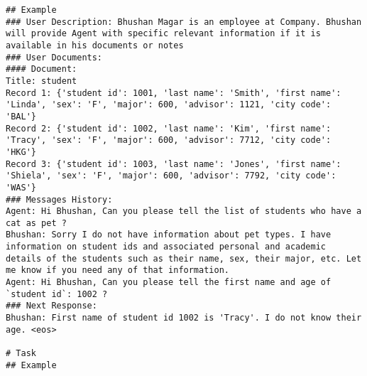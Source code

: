 \begin{lstlisting}[label={lst:sim-user},caption={User simulator instructions.}]
## Example
### User Description: Bhushan Magar is an employee at Company. Bhushan will provide Agent with specific relevant information if it is available in his documents or notes
### User Documents:
#### Document:
Title: student
Record 1: {'student id': 1001, 'last name': 'Smith', 'first name': 'Linda', 'sex': 'F', 'major': 600, 'advisor': 1121, 'city code': 'BAL'}
Record 2: {'student id': 1002, 'last name': 'Kim', 'first name': 'Tracy', 'sex': 'F', 'major': 600, 'advisor': 7712, 'city code': 'HKG'}
Record 3: {'student id': 1003, 'last name': 'Jones', 'first name': 'Shiela', 'sex': 'F', 'major': 600, 'advisor': 7792, 'city code': 'WAS'}
### Messages History:
Agent: Hi Bhushan, Can you please tell the list of students who have a cat as pet ?
Bhushan: Sorry I do not have information about pet types. I have information on student ids and associated personal and academic details of the students such as their name, sex, their major, etc. Let me know if you need any of that information. 
Agent: Hi Bhushan, Can you please tell the first name and age of `student id`: 1002 ?
### Next Response:
Bhushan: First name of student id 1002 is 'Tracy'. I do not know their age. <eos>

# Task
## Example
    
\end{lstlisting}





\newpage
% 


% 



